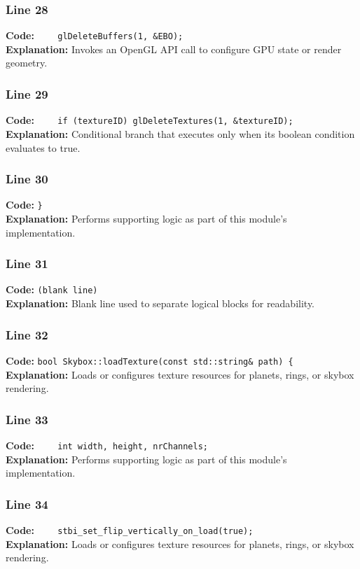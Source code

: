 \documentclass[11pt,a4paper]{article}
\begin{document}
\subsubsection*{Line 28}
\textbf{Code:} \verb|    glDeleteBuffers(1, &EBO);|\\
\textbf{Explanation:} Invokes an OpenGL API call to configure GPU state or render geometry.

\subsubsection*{Line 29}
\textbf{Code:} \verb|    if (textureID) glDeleteTextures(1, &textureID);|\\
\textbf{Explanation:} Conditional branch that executes only when its boolean condition evaluates to true.

\subsubsection*{Line 30}
\textbf{Code:} \verb|}|\\
\textbf{Explanation:} Performs supporting logic as part of this module's implementation.

\subsubsection*{Line 31}
\textbf{Code:} \texttt{(blank line)}\\
\textbf{Explanation:} Blank line used to separate logical blocks for readability.

\subsubsection*{Line 32}
\textbf{Code:} \verb|bool Skybox::loadTexture(const std::string& path) {|\\
\textbf{Explanation:} Loads or configures texture resources for planets, rings, or skybox rendering.

\subsubsection*{Line 33}
\textbf{Code:} \verb|    int width, height, nrChannels;|\\
\textbf{Explanation:} Performs supporting logic as part of this module's implementation.

\subsubsection*{Line 34}
\textbf{Code:} \verb|    stbi_set_flip_vertically_on_load(true);|\\
\textbf{Explanation:} Loads or configures texture resources for planets, rings, or skybox rendering.
\end{document}
